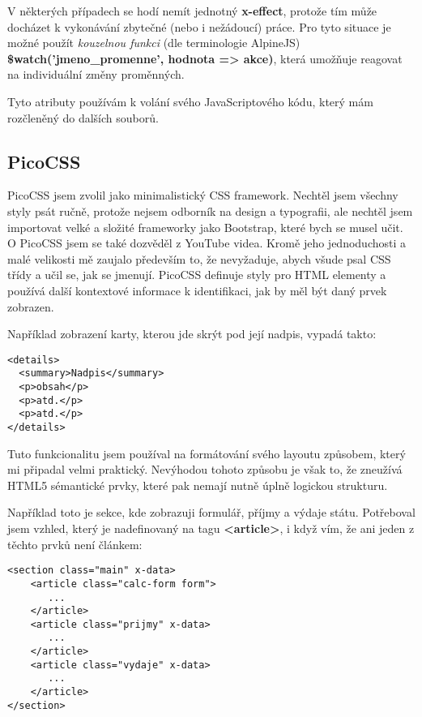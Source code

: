 \documentclass[11pt,a4paper,twoside,openright]{report}
\begin{document}
V některých případech se hodí nemít jednotný \textbf{x-effect}, protože tím může docházet k vykonávání
zbytečné (nebo i nežádoucí) práce. Pro tyto situace je možné použít \emph{kouzelnou funkci} (dle terminologie
AlpineJS) \textbf{\$watch('jmeno\_promenne', hodnota => akce)}, která umožňuje reagovat na individuální
změny proměnných.

Tyto atributy používám k volání svého JavaScriptového kódu, který mám rozčleněný do dalších souborů.

\subsection{PicoCSS}

PicoCSS jsem zvolil jako minimalistický CSS framework. Nechtěl jsem všechny styly psát ručně, protože
nejsem odborník na design a typografii, ale nechtěl jsem importovat velké a složité frameworky jako
Bootstrap, které bych se musel učit. O PicoCSS jsem se také dozvěděl z YouTube videa. Kromě jeho jednoduchosti
a malé velikosti mě zaujalo především to, že nevyžaduje, abych všude psal CSS třídy a učil se, jak se
jmenují. PicoCSS definuje styly pro HTML elementy a používá další kontextové informace k identifikaci,
jak by měl být daný prvek zobrazen.

Například zobrazení karty, kterou jde skrýt pod její nadpis, vypadá takto:

\begin{verbatim}
<details>
  <summary>Nadpis</summary>
  <p>obsah</p>
  <p>atd.</p>
  <p>atd.</p>
</details>
\end{verbatim}

Tuto funkcionalitu jsem používal na formátování svého layoutu způsobem, který mi připadal velmi praktický.
Nevýhodou tohoto způsobu je však to, že zneužívá HTML5 sémantické prvky, které pak nemají nutně úplně logickou
strukturu.

Například toto je sekce, kde zobrazuji formulář, příjmy a výdaje státu. Potřeboval jsem vzhled, který
je nadefinovaný na tagu \textbf{<article>}, i když vím, že ani jeden z těchto prvků není článkem:

\begin{verbatim}
<section class="main" x-data>
    <article class="calc-form form">
       ...
    </article>
    <article class="prijmy" x-data>
       ...
    </article>
    <article class="vydaje" x-data>
       ...
    </article>
</section>
\end{verbatim}
\end{document}
